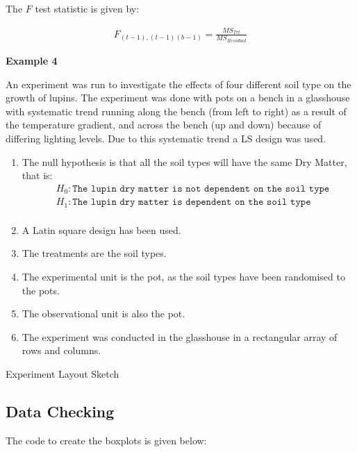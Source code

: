 \documentclass[a4paper, 10pt, fleqn, twosided]{memoir}
\begin{document}
The $F$ test statistic is given by:

\begin{eqnarray*}
F_{(t-1),(t-1)(b-1)} = \frac{MS_{Trt}}{MS_{Residual}}
\end{eqnarray*}

\textbf{Example 4}

An experiment was run to investigate the effects of four different soil type on the growth of lupins. The experiment was done with
pots on a bench in a glasshouse with systematic trend running along the bench (from left to right) as a result of the
temperature gradient, and across the bench (up and down) because of differing lighting levels. Due to this systematic
trend a LS design was used.


\begin{enumerate}
\item The null hypothesis is that all the soil types will have the same Dry Matter, that is:
\begin{align*}
& H_0: \texttt{The lupin dry matter is not dependent on the soil type}\\
& H_1:\texttt{The lupin dry matter is dependent on the soil type}\\
\end{align*}
\item A Latin square design has been used. \\
\item The treatments are the soil types.\\
\item The experimental unit is the pot, as the soil types have been randomised to the pots.\\
\item The observational unit is also the pot.\\
\item The experiment was conducted in the glasshouse in a rectangular array of rows and columns.\\
\end{enumerate}


\begin{application}{Experiment Layout Sketch}
\vspace{10cm}
\end{application}


\subsection{Data Checking}
The code to create the boxplots is given below:
\end{document}
